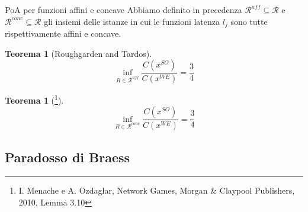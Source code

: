 \documentclass{beamer}
\newcounter{counter1}
\theoremstyle{plain}
\newtheorem{myteo}[counter1]{Teorema}
\theoremstyle{definition}
\theoremstyle{remark}
\newcommand{\pa}[1]{\left(#1\right)}
\begin{document}
\begin{frame}{PoA per funzioni affini e concave}
  Abbiamo definito in precedenza
  $\mathcal{R}^{aff} \subseteq \mathcal{R}$ e $\mathcal{R}^{conc}
  \subseteq \mathcal{R}$  gli insiemi delle istanze in
  cui le funzioni latenza $l_j$ sono tutte rispettivamente affini e concave.
  \begin{myteo}[Roughgarden and Tardos]
    \[ \inf _{R\in \mathcal{R}^{aff}} \frac{C\pa{ x^{SO}}}{C\pa{
          x^{WE}}} = \frac{3}{4} \]
  \end{myteo}
  \begin{myteo}[\footnote{I. Menache e A. Ozdaglar, Network Games,
      Morgan \& Claypool Publishers, 2010, Lemma 3.10}]
    \[ \inf _{R\in \mathcal{R}^{conc}} \frac{C\pa{ x^{SO}}}{C\pa{
          x^{WE}}} = \frac{3}{4} \]
  \end{myteo}
\end{frame}

\subsection{Paradosso di Braess}
\end{document}
